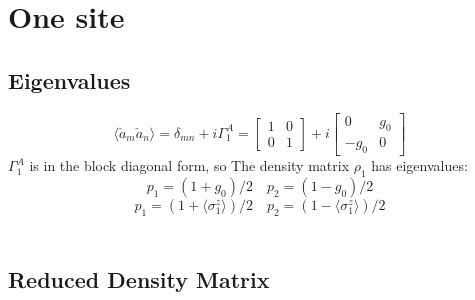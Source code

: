 \documentclass[12pt,a4paper]{book}
\theoremstyle{definition}
\begin{document}
\section{One site}

\subsection{Eigenvalues}

\begin{equation}
	\langle\check{a}_{m} \check{a}_{n}\rangle=\delta_{m n}+i\Gamma_1^A= \left[\begin{array}{cc}
		1 & 0 \\
		0 & 1
	\end{array}\right]+i\left[\begin{array}{cc}
		0 & g_0 \\
		-g_0 & 0
	\end{array}\right]
\end{equation}
$\Gamma^A_1$ is in the block diagonal form, so 
The density matrix $\rho_1$ has eigenvalues:\\
\begin{equation}\label{eq:eigonesite}
	p_1=(1+g_0)/2 \quad p_2=(1-g_0)/2
\end{equation}
\begin{equation}
	p_1=(1+	\langle{\sigma}_{1}^{z}\rangle)/2 \quad p_2=(1-	\langle{\sigma}_{1}^{z}\rangle)/2
\end{equation}\\


\subsection{Reduced Density Matrix}
\end{document}
